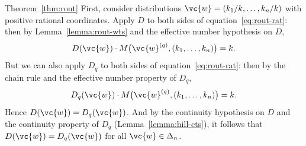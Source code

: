 \begin{pfof}{Theorem~\ref{thm:rout}}
First, consider distributions $\vc{w} = (k_1/k, \ldots, k_n/k)$ with
positive rational coordinates.  Apply $D$ to both sides of
equation~\eqref{eq:rout-rat}: then by Lemma~\ref{lemma:rout-wts} and the
effective number hypothesis on $D$,
\[
D(\vc{w}) \cdot M\bigl( \vc{w}^{(q)}, (k_1, \ldots, k_n ) \bigr)
=
k.
\]
But we can also apply $D_q$ to both sides of equation~\eqref{eq:rout-rat}:
then by the chain rule and the effective number property of $D_q$,
\[
D_q(\vc{w}) \cdot M\bigl( \vc{w}^{(q)}, (k_1, \ldots, k_n) \bigr)
=
k.
\]
Hence $D(\vc{w}) = D_q(\vc{w})$.  And by the continuity hypothesis on $D$
and the continuity property of $D_q$
(Lemma~\ref{lemma:hill-cts}), it follows that
$D(\vc{w}) = D_q(\vc{w})$ for all $\vc{w} \in \Delta_n$.
\end{pfof}
